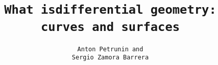 \title{\tt What isdifferential geometry:\\
curves and surfaces}
\author{\tt Anton Petrunin and \\ Sergio Zamora Barrera}
\date{}
\maketitle
\thispagestyle{empty}
